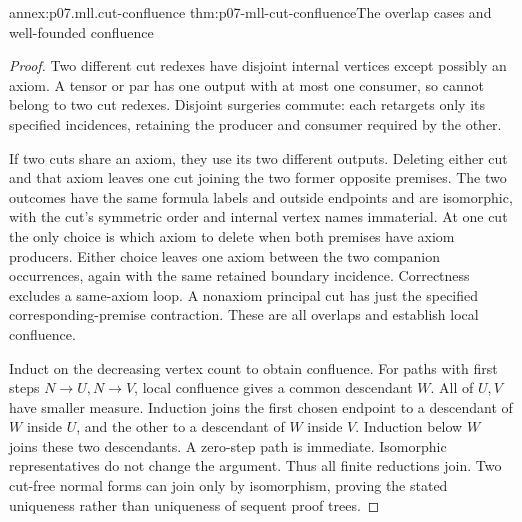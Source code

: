 \begin{annexitem}{annex:p07.mll.cut-confluence}
 {thm:p07-mll-cut-confluence}{The overlap cases and well-founded confluence}
\begin{proof}
Two different cut redexes have disjoint internal vertices except possibly
an axiom. A tensor or par has one output with at most one consumer,
so cannot belong to two cut redexes. Disjoint surgeries commute:
each retargets only its specified incidences, retaining the producer
and consumer required by the other.

If two cuts share an axiom, they use its two different outputs.
Deleting either cut and that axiom leaves one cut joining the two
former opposite premises. The two outcomes have the same formula
labels and outside endpoints and are isomorphic, with the cut's
symmetric order and internal vertex names immaterial.
At one cut the only choice is which axiom to delete when both premises
have axiom producers. Either choice leaves one axiom between the two
companion occurrences, again with the same retained boundary incidence.
Correctness excludes a same-axiom loop. A nonaxiom principal cut has
just the specified corresponding-premise contraction.
These are all overlaps and establish local confluence.

Induct on the decreasing vertex count to obtain confluence.
For paths with first steps \(N\to U,N\to V\), local confluence gives
a common descendant \(W\). All of \(U,V\) have smaller measure.
Induction joins the first chosen endpoint to a descendant of \(W\)
inside \(U\), and the other to a descendant of \(W\) inside \(V\).
Induction below \(W\) joins these two descendants. A zero-step path
is immediate. Isomorphic representatives do not change the argument.
Thus all finite reductions join. Two cut-free normal forms can join
only by isomorphism, proving the stated uniqueness rather than
uniqueness of sequent proof trees.
\end{proof}
\end{annexitem}

